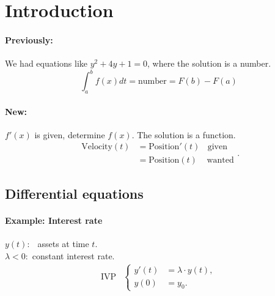\documentclass[]{article}
\begin{document}
\section{Introduction}
	\paragraph{Previously:}
	We had equations like  $y ^{2}+4y+1=0$, where the solution is a number.
	\[
		\int_{a}^{b} f(x) dt = \text{number} = F(b)-F(a)	
	\]
	\paragraph{New:}
	$ f'(x) $ is given, determine $ f(x) $. The solution is a function.
	\[
		\begin{split}
			\text{Velocity}(t) & = \text{Position}'(t)~~~~  \text{given}  \\
					   & = \text{Position}(t)~~~~~  \text{wanted}
		\end{split}
	.\]
	\subsection{Differential equations}
	\begin{multicols}{2}
	\paragraph{Example:
	Interest rate}
	$~$\\
	$y(t):~~$ assets at time $t$. \\
	$\lambda<0:$ constant interest rate.
	\[
	\begin{split}
		\text{IVP}&
	\begin{cases} 
		y'(t) & =\lambda\cdot y(t), \\
		y(0) & =y_0.
	\end{cases}\\
	\end{split}
	\]$~$
	\begin{center}
	\end{center}	
	\end{multicols}
\end{document}
